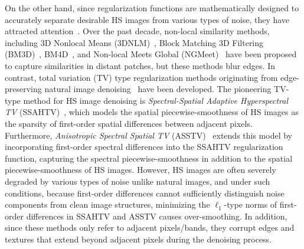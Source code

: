 On the other hand, since regularization functions are mathematically designed to accurately separate desirable HS images from various types of noise, they have attracted attention~\cite{Xue2017Robust,Jiang2022Adaptive,Naganuma2024Unmixing}. Over the past decade, non-local similarity methods, including 3D Nonlocal Means (3DNLM)~\cite{Qian20123DNLM}, Block Matching 3D Filtering (BM3D)~\cite{Maggioni2013BM3D}, BM4D~\cite{Chen2014BM4D}, and Non-local Meets Global (NGMeet)~\cite{He2019NGmeet} have been proposed to capture similarities in distant patches, but these methods blur edges. In contrast, total variation (TV) type regularization methods originating from edge-preserving natural image denoising~\cite{Rudin1992TV,Bresson2008TV} have been developed. The pioneering TV-type method for HS image denoising is \textit{Spectral-Spatial Adaptive Hyperspectral TV} (SSAHTV)~\cite{Yuan2012HTV}, which models the spatial piecewise-smoothness of HS images as the sparsity of first-order spatial differences between adjacent pixels. Furthermore, \textit{Anisotropic Spectral Spatial TV} (ASSTV)~\cite{Chang2015ASSTV} extends this model by incorporating first-order spectral differences into the SSAHTV regularization function, capturing the spectral piecewise-smoothness in addition to the spatial piecewise-smoothness of HS images. However, HS images are often severely degraded by various types of noise unlike natural images, and under such conditions, because first-order differences cannot sufficiently distinguish noise components from clean image structures, minimizing the $\ell_{1}$-type norms of first-order differences in SSAHTV and ASSTV causes over-smoothing. In addition, since these methods only refer to adjacent pixels/bands, they corrupt edges and textures that extend beyond adjacent pixels during the denoising process.


